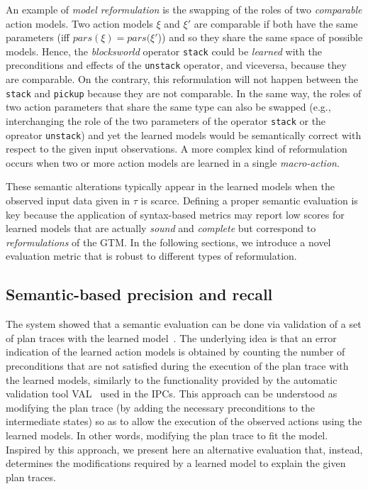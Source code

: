 An example of \emph{model reformulation} is the swapping of the roles of two {\em comparable} action models. Two action models $\xi$ and $\xi'$ are comparable if both have the same parameters (iff $pars(\xi)=pars(\xi'$)) and so they share the same space of possible models. Hence, the {\em blocksworld} operator {\small\tt stack} could be {\em learned} with the preconditions and effects of the {\small\tt unstack} operator, and viceversa, because they are comparable. On the contrary, this reformulation will not happen between the {\tt stack} and {\tt pickup} because they are not comparable. In the same way, the roles of two action parameters that share the same type can also be swapped (e.g., interchanging the role of the two parameters of the operator {\small\tt stack} or the opreator {\small\tt unstack}) and yet the learned models would be semantically correct with respect to the given input observations. A more complex kind of reformulation occurs when two or more action models are learned in a single \emph{macro-action}.


These semantic alterations typically appear in the learned models when the observed input data given in $\tau$ is scarce. Defining a proper semantic evaluation is key because the application of syntax-based metrics may report low scores for learned models that are actually {\em sound} and {\em complete} but correspond to {\em reformulations} of the GTM. In the following sections, we introduce a novel evaluation metric that is robust to different types of reformulation.


\subsection{Semantic-based precision and recall}
\label{semantic_precision_recall}

The \ARMS system showed that a semantic evaluation can be done via validation of a set of plan traces with the learned model~\cite{yang2007learning}. The underlying idea is that an error indication of the learned action models is obtained by counting the number of preconditions that are not satisfied during the execution of the plan trace with the learned models, similarly to the functionality provided by the automatic validation tool VAL~\cite{howey2004val} used in the IPCs. This approach can be understood as modifying the plan trace (by adding the necessary preconditions to the intermediate states) so as to allow the execution of the observed actions using the learned models. In other words, modifying the plan trace to fit the model. Inspired by this approach, we present here an alternative evaluation that, instead, determines the modifications required by a learned model to explain the given plan traces.


